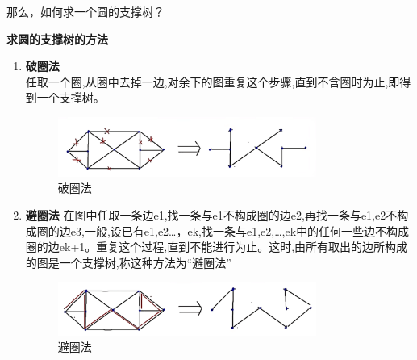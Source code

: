 	那么，如何求一个圆的支撑树？
	\begin{notebox}\textbf{{求圆的支撑树的方法}}{}
		\begin{enumerate}
			\item \textbf{破圈法}\\
			任取一个圈,从圈中去掉一边,对余下的图重复这个步骤,直到不含圈时为止,即得到一个支撑树。
			\begin{figure}[H]
				\centering
				\includegraphics[width=0.8\textwidth]{./image/33.png}
				\caption{破圈法}
				\label{fig:Chapter4_Temporary_Pavilion_1}
			\end{figure}
			\item \textbf{避圈法}
			在图中任取一条边e1,找一条与e1不构成圈的边e2,再找一条与{e1,e2}不构成圈的边e3,一般,设已有{e1,e2…，ek},找一条与{e1,e2,…,ek}中的任何一些边不构成圈的边ek+1。重复这个过程,直到不能进行为止。这时,由所有取出的边所构成的图是一个支撑树,称这种方法为“避圈法”
			\begin{figure}[H]
				\centering
				\includegraphics[width=0.8\textwidth]{./image/34.png}
				\caption{避圈法}
				\label{fig:Chapter4_Temporary_Pavilion_1}
			\end{figure}
		\end{enumerate}
	\end{notebox}

